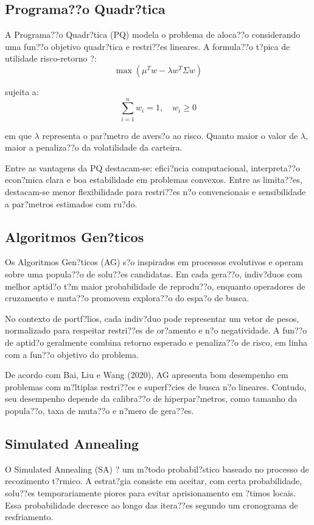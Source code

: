 ﻿\documentclass[
  12pt,
  oneside,
  a4paper,
  brazil
]{abntex2}
\begin{document}
\subsection{Programa??o Quadr?tica}
A Programa??o Quadr?tica (PQ) modela o problema de aloca??o considerando uma fun??o objetivo quadr?tica e restri??es lineares. A formula??o t?pica de utilidade risco-retorno ?:
\[
\max \left(\mu^T w - \lambda w^T\Sigma w\right)
\]

sujeita a:
\[
\sum_{i=1}^{n}w_i=1, \quad w_i\geq 0
\]

em que $\lambda$ representa o par?metro de avers?o ao risco. Quanto maior o valor de $\lambda$, maior a penaliza??o da volatilidade da carteira.

Entre as vantagens da PQ destacam-se: efici?ncia computacional, interpreta??o econ?mica clara e boa estabilidade em problemas convexos. Entre as limita??es, destacam-se menor flexibilidade para restri??es n?o convencionais e sensibilidade a par?metros estimados com ru?do.

\subsection{Algoritmos Gen?ticos}
Os Algoritmos Gen?ticos (AG) s?o inspirados em processos evolutivos e operam sobre uma popula??o de solu??es candidatas. Em cada gera??o, indiv?duos com melhor aptid?o t?m maior probabilidade de reprodu??o, enquanto operadores de cruzamento e muta??o promovem explora??o do espa?o de busca.

No contexto de portf?lios, cada indiv?duo pode representar um vetor de pesos, normalizado para respeitar restri??es de or?amento e n?o negatividade. A fun??o de aptid?o geralmente combina retorno esperado e penaliza??o de risco, em linha com a fun??o objetivo do problema.

De acordo com Bai, Liu e Wang (2020), AG apresenta bom desempenho em problemas com m?ltiplas restri??es e superf?cies de busca n?o lineares. Contudo, seu desempenho depende da calibra??o de hiperpar?metros, como tamanho da popula??o, taxa de muta??o e n?mero de gera??es.

\subsection{Simulated Annealing}
O Simulated Annealing (SA) ? um m?todo probabil?stico baseado no processo de recozimento t?rmico. A estrat?gia consiste em aceitar, com certa probabilidade, solu??es temporariamente piores para evitar aprisionamento em ?timos locais. Essa probabilidade decresce ao longo das itera??es segundo um cronograma de resfriamento.
\end{document}
